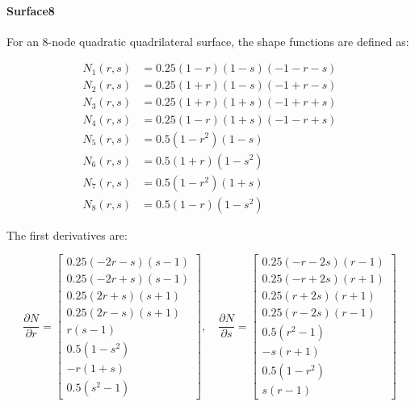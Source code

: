 \paragraph{Surface8} For an 8-node quadratic quadrilateral surface, the shape functions are defined as:

\[
\begin{aligned}
N_1(r, s) &= 0.25(1 - r)(1 - s)(-1 - r - s) \\
N_2(r, s) &= 0.25(1 + r)(1 - s)(-1 + r - s) \\
N_3(r, s) &= 0.25(1 + r)(1 + s)(-1 + r + s) \\
N_4(r, s) &= 0.25(1 - r)(1 + s)(-1 - r + s) \\
N_5(r, s) &= 0.5(1 - r^2)(1 - s) \\
N_6(r, s) &= 0.5(1 + r)(1 - s^2) \\
N_7(r, s) &= 0.5(1 - r^2)(1 + s) \\
N_8(r, s) &= 0.5(1 - r)(1 - s^2)
\end{aligned}
\]

The first derivatives are:

\[
\frac{\partial N}{\partial r} =
\begin{bmatrix}
0.25(-2r - s)(s - 1) \\
0.25(-2r + s)(s - 1) \\
0.25(2r + s)(s + 1) \\
0.25(2r - s)(s + 1) \\
r(s - 1) \\
0.5(1 - s^2) \\
-r(1 + s) \\
0.5(s^2 - 1)
\end{bmatrix}, \quad
\frac{\partial N}{\partial s} =
\begin{bmatrix}
0.25(-r - 2s)(r - 1) \\
0.25(-r + 2s)(r + 1) \\
0.25(r + 2s)(r + 1) \\
0.25(r - 2s)(r - 1) \\
0.5(r^2 - 1) \\
-s(r + 1) \\
0.5(1 - r^2) \\
s(r - 1)
\end{bmatrix}
\]

